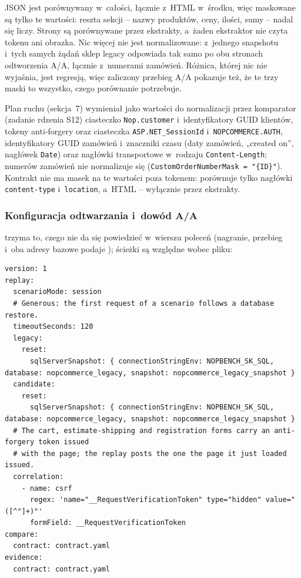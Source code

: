 JSON jest porównywany w~całości, łącznie z~HTML w~środku, więc maskowane są tylko te
wartości: reszta sekcji -- nazwy produktów, ceny, ilości, sumy -- nadal się liczy. Strony
są porównywane przez ekstrakty, a~żaden ekstraktor nie czyta tokenu ani obrazka. Nic
więcej nie jest normalizowane: z~jednego snapshotu i~tych samych żądań sklep legacy
odpowiada tak samo po obu stronach odtworzenia A/A, łącznie z~numerami zamówień. Różnica,
której nic nie wyjaśnia, jest regresją, więc zaliczony przebieg A/A pokazuje też, że te
trzy maski to wszystko, czego porównanie potrzebuje.

Plan ruchu (sekcja~7) wymieniał jako wartości do normalizacji przez komparator (zadanie
rdzenia S12) ciasteczko \texttt{Nop.customer} i~identyfikatory GUID klientów, tokeny
anti-forgery oraz ciasteczka \texttt{ASP.NET\_SessionId} i~\texttt{NOPCOMMERCE.AUTH},
identyfikatory GUID zamówień i~znaczniki czasu (daty zamówień, „created on”, nagłówek
\texttt{Date}) oraz nagłówki transportowe w~rodzaju \texttt{Content-Length}; numerów
zamówień nie normalizuje się (\texttt{CustomOrderNumberMask = "\{ID\}"}). Kontrakt nie ma
masek na te wartości poza tokenem: porównuje tylko nagłówki \texttt{content-type}
i~\texttt{location}, a~HTML -- wyłącznie przez ekstrakty.


\subsubsection{Konfiguracja odtwarzania i~dowód A/A}\label{sec:bench-kontrakt-aa}

 trzyma to, czego nie da się powiedzieć w~wierszu poleceń
(nagranie, przebieg i~oba adresy bazowe podaje ); ścieżki są
względne wobec pliku:

\begin{lstlisting}
version: 1
replay:
  scenarioMode: session
  # Generous: the first request of a scenario follows a database restore.
  timeoutSeconds: 120
  legacy:
    reset:
      sqlServerSnapshot: { connectionStringEnv: NOPBENCH_SK_SQL, database: nopcommerce_legacy, snapshot: nopcommerce_legacy_snapshot }
  candidate:
    reset:
      sqlServerSnapshot: { connectionStringEnv: NOPBENCH_SK_SQL, database: nopcommerce_legacy, snapshot: nopcommerce_legacy_snapshot }
  # The cart, estimate-shipping and registration forms carry an anti-forgery token issued
  # with the page; the replay posts the one the page it just loaded issued.
  correlation:
    - name: csrf
      regex: 'name="__RequestVerificationToken" type="hidden" value="([^"]+)"'
      formField: __RequestVerificationToken
compare:
  contract: contract.yaml
evidence:
  contract: contract.yaml
\end{lstlisting}

